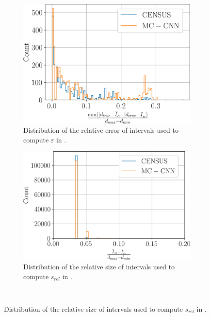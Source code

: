 \begin{figure}
    \begin{subfigure}[t]{0.47\linewidth}
        \flushleft
        \includegraphics[width=0.91\linewidth]{Images/Chap_5/histogram_eps_cones.png}
        \caption{Distribution of the relative error of intervals used to compute $\varepsilon$ in .}
        \label{fig:distribution_residual_error}
    \end{subfigure}\hfill
    \begin{subfigure}[t]{0.47\linewidth}
        \flushright
        \includegraphics[width=\linewidth]{Images/Chap_5/histogram_s_rel_cones.png}
        \caption{Distribution of the relative size of intervals used to compute $s_{rel}$ in .}
        \label{fig:distribution_rel_size}
    \end{subfigure}\vspace*{1cm}\\

\end{figure}

